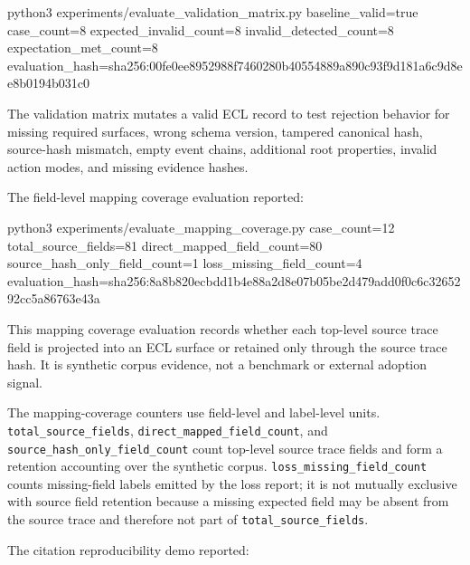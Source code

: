 \documentclass[
]{article}
\newenvironment{Shaded}{}{}
\newcommand{\NormalTok}[1]{#1}
\begin{document}
\begin{Shaded}
\begin{Highlighting}[]
\NormalTok{python3 experiments/evaluate\_validation\_matrix.py}
\NormalTok{baseline\_valid=true}
\NormalTok{case\_count=8}
\NormalTok{expected\_invalid\_count=8}
\NormalTok{invalid\_detected\_count=8}
\NormalTok{expectation\_met\_count=8}
\NormalTok{evaluation\_hash=sha256:00fe0ee8952988f7460280b40554889a890c93f9d181a6c9d8ee8b0194b031c0}
\end{Highlighting}
\end{Shaded}

The validation matrix mutates a valid ECL record to test rejection
behavior for missing required surfaces, wrong schema version, tampered
canonical hash, source-hash mismatch, empty event chains, additional
root properties, invalid action modes, and missing evidence hashes.

The field-level mapping coverage evaluation reported:

\begin{Shaded}
\begin{Highlighting}[]
\NormalTok{python3 experiments/evaluate\_mapping\_coverage.py}
\NormalTok{case\_count=12}
\NormalTok{total\_source\_fields=81}
\NormalTok{direct\_mapped\_field\_count=80}
\NormalTok{source\_hash\_only\_field\_count=1}
\NormalTok{loss\_missing\_field\_count=4}
\NormalTok{evaluation\_hash=sha256:8a8b820ecbdd1b4e88a2d8e07b05be2d479add0f0c6c3265292cc5a86763e43a}
\end{Highlighting}
\end{Shaded}

This mapping coverage evaluation records whether each top-level source
trace field is projected into an ECL surface or retained only through
the source trace hash. It is synthetic corpus evidence, not a benchmark
or external adoption signal.

The mapping-coverage counters use field-level and label-level units.
\texttt{total\_source\_fields}, \texttt{direct\_mapped\_field\_count},
and \texttt{source\_hash\_only\_field\_count} count top-level source
trace fields and form a retention accounting over the synthetic corpus.
\texttt{loss\_missing\_field\_count} counts missing-field labels emitted
by the loss report; it is not mutually exclusive with source field
retention because a missing expected field may be absent from the source
trace and therefore not part of \texttt{total\_source\_fields}.

The citation reproducibility demo reported:
\end{document}
